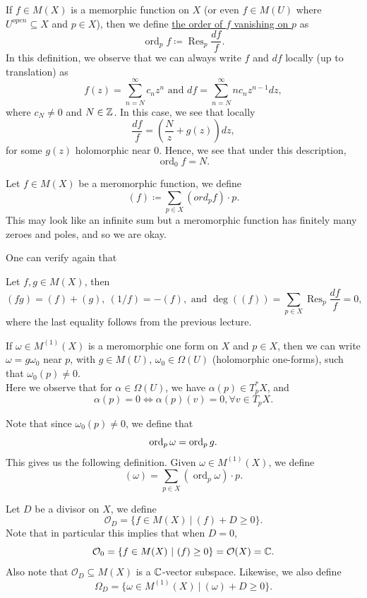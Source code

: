 \documentclass{article}
\begin{document}
{\begin{definition}
If $f \in M(X)$ is a memorphic function on $X$ (or even $f \in M(U)$ where $U^{open} \subseteq X$ and $p \in X$), then we define \underline{the order of $f$ vanishing on $p$} as  
\[\operatorname{ord}_p f \coloneqq \operatorname{Res}_p \frac{df}{f}.\]
In this definition, we observe that we can always write $f$ and $df$ locally (up to translation) as
\[f(z) = \sum_{n = N}^\infty c_n z^n \text{ and } df = \sum_{n = N}^\infty n c_n z^{n-1} dz,\]
where $c_N \neq 0$ and $N \in \mathbb{Z}$. In this case, we see that locally
\[\frac{df}{f} = (\frac{N}{z} + g(z) ) dz,\]
for some $g(z)$ holomorphic near $0$. Hence, we see that under this description,
\[\operatorname{ord}_0 f = N.\]
\end{definition}


\begin{definition}
    Let $f \in M(X)$ be a meromorphic function, we define
    \[(f) \coloneqq \sum_{p \in X} (ord_p f) \cdot p.\]
    This may look like an infinite sum but a meromorphic function has finitely many zeroes and poles, and so we are okay.
\end{definition}

One can verify again that
\begin{lemma}
    Let $f, g \in M(X)$, then
    \[(fg) = (f) + (g),\ (1/f) = -(f), \text{ and } \deg((f)) = \sum_{p \in X} \operatorname{Res}_p \frac{df}{f} = 0,\]
    where the last equality follows from the previous lecture.
\end{lemma}

If $\omega \in M^{(1)}(X)$ is a meromorphic one form on $X$ and $p \in X$, then we can write $\omega = g \omega_0$ near $p$, with $g \in M(U)$, $\omega_0 \in \Omega(U)$ (holomorphic one-forms), such that $\omega_0(p) \neq 0$.\\

Here we observe that for $\alpha \in \Omega(U)$, we have $\alpha(p) \in T^*_p X$, and 
\[\alpha(p) = 0 \iff  \alpha(p)(v) = 0, \forall v \in T_p X.\]

\begin{definition}
Note that since $\omega_0(p) \neq 0$, we define that
\[\operatorname{ord}_p \omega = \operatorname{ord}_p g.\]
This gives us the following definition. Given $\omega \in M^{(1)}(X)$, we define
    \[(\omega) = \sum_{p \in X} (\operatorname{ord}_p \omega)\cdot p.\]
\end{definition}

\begin{definition}
    Let $D$ be a divisor on $X$, we define
    \[\mathcal{O}_D = \{f \in M(X)\ |\ (f) + D \geq 0\}.\]
    Note that in particular this implies that when $D = 0$,
    \[\mathcal{O}_0 = \{f \in M(X)\ |\ (f) \geq 0\} = \mathcal{O}(X) = \mathbb{C}.\]
    Also note that $\mathcal{O}_D \subseteq M(X)$ is a $\mathbb{C}$-vector subspace. Likewise, we also define
    \[\Omega_D = \{\omega \in M^{(1)}(X)\ |\ (\omega) + D \geq 0\}.\]
\end{definition}

}
\end{document}
